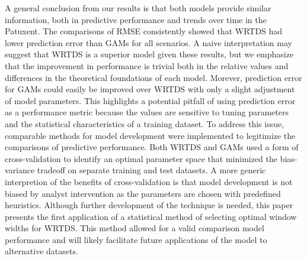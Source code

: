\documentclass[letterpaper,12pt,oneside]{article}\usepackage[]{graphicx}\usepackage[]{color}
\begin{document}
A general conclusion from our results is that both models provide similar information, both in predictive performance and trends over time in the Patuxent.  The comparisons of \ac{RMSE} consistently showed that \ac{WRTDS} had lower prediction error than \acp{GAM} for all scenarios.  A naive interpretation may suggest that \ac{WRTDS} is a superior model given these results, but we emphasize that the improvement in performance is trivial both in the relative values and differences in the theoretical foundations of each model.  Morever, prediction error for \acp{GAM} could easily be improved over \ac{WRTDS} with only a slight adjustment of model parameters.  This highlights a potential pitfall of using prediction error as a performance metric because the values are sensitive to tuning parameters and the statistical characteristics of a training dataset. To address this issue, comparable methods for model development were implemented to legitimize the comparisons of predictive performance.  Both \ac{WRTDS} and \acp{GAM} used a form of cross-validation to identify an optimal parameter space that minimized the bias-variance tradeoff on separate training and test datasets.  A more generic interpretion of the benefits of cross-validation is that model development is not biased by analyst intervention as the parameters are chosen with predefined heuristics.  Although further development of the technique is needed, this paper presents the first application of a statistical method of selecting optimal window widths for \ac{WRTDS}.  This method allowed for a valid comparison model performance and will likely facilitate future applications of the model to alternative datasets.
\end{document}
